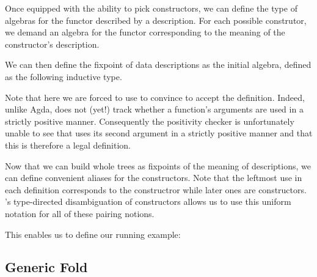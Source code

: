 \begin{minipage}[t]{0.3\textwidth}
\end{minipage}\hfill
\begin{minipage}[t]{0.5\textwidth}
\end{minipage}

Once equipped with the ability to pick constructors, we can define
the type of algebras for the functor described by a 
description. For each possible construtor, we demand an algebra for
the functor corresponding to the meaning of the  constructor's description.


We can then define the fixpoint of data descriptions as the initial
algebra, defined as the following inductive type.



Note that here we are forced to use \assertTotal{} to convince \idris{}
to accept the definition.
%
Indeed, unlike Agda, \idris{} does not (yet!) track whether a function's
arguments are used in a strictly positive manner.
%
Consequently the positivity checker
is unfortunately unable to see that  uses its second
argument in a strictly positive manner
and that this is therefore a legal definition.

Now that we can build whole trees as fixpoints of the
meaning of descriptions, we can define convenient aliases for
the  constructors.
%
Note that the leftmost \IdrisData{(\#)} use in each definition corresponds
to the  constructror while later ones are 
constructors.
%
\idris{}'s type-directed disambiguation of constructors allows us to use
this uniform notation for all of these pairing notions.


This enables us to define our running example:


\subsection{Generic Fold}\label{sec:genericfoldinductive}

